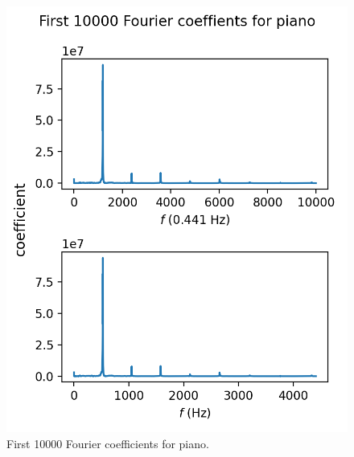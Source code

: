 \documentclass[11pt]{article}
\begin{document}
\begin{figure}[H]
    \centering
    \includegraphics[scale = 0.68]{images/ps-8-2FTp.png}
    \caption{First 10000 Fourier coefficients for piano.}
    \label{fig:FTp}
\end{figure}
\end{document}
